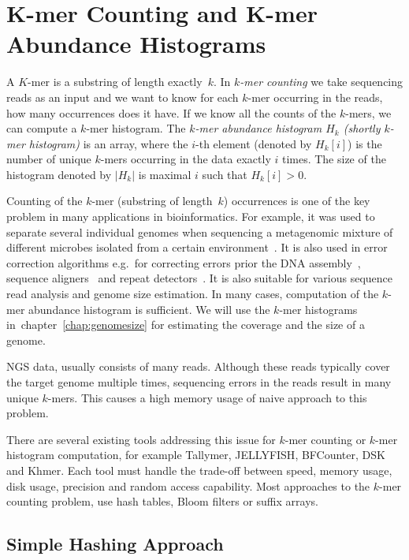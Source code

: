 \chapter[K-mer Counting]{K-mer Counting and K-mer Abundance Histograms}

A $K$-mer is a substring of length exactly~$k$. In \emph{$k$-mer counting} we take sequencing reads as an input and we want to know for each $k$-mer occurring in the reads, how many occurrences does it have. If we know all the counts of the $k$-mers, we can compute a $k$-mer histogram.
The \emph{$k$-mer abundance histogram $H_k$ (shortly $k$-mer histogram)} is an array, where the $i$-th element (denoted by $H_k[i]$) is the number of unique $k$-mers occurring in the data exactly $i$ times. The size of the histogram denoted by $|H_k|$ is maximal $i$ such that $H_k[i] > 0$.

Counting of the $k$-mer (substring of length~$k$) occurrences is one of the key problem in many applications in bioinformatics.
For example, it was used to separate several individual
genomes when sequencing a metagenomic mixture of different microbes isolated from a certain environment~\cite{Wu2011, Wang2012}.
It is also used in error correction algorithms e.g.\ for correcting errors prior the DNA assembly~\cite{Pevzner2001}, sequence aligners~\cite{edgar2004muscle} and repeat detectors~\cite{caponnetto2013efficiency}.
It is also suitable for various sequence read analysis and genome size estimation\cite{covest, williams, waterman}. In many cases, computation of the $k$-mer abundance histogram is sufficient.
We will use the $k$-mer histograms in~chapter~\ref{chap:genomesize} for estimating the coverage and the size of a genome.

NGS data, usually consists of many reads. Although these reads typically cover the target genome multiple times, sequencing errors in the reads result in many unique $k$-mers.
This causes a high memory usage of naive approach to this problem.

There are several existing tools addressing this issue for $k$-mer counting or $k$-mer histogram computation, for example Tallymer\cite{tallymer}, JELLYFISH\cite{jellyfish}, BFCounter\cite{bfcounter}, DSK\cite{dsk} and Khmer\cite{khmer}. Each tool must handle the trade-off between speed, memory usage, disk usage, precision and random access capability. Most approaches to the $k$-mer counting problem, use hash tables, Bloom filters or suffix arrays.

\section{Simple Hashing Approach}

